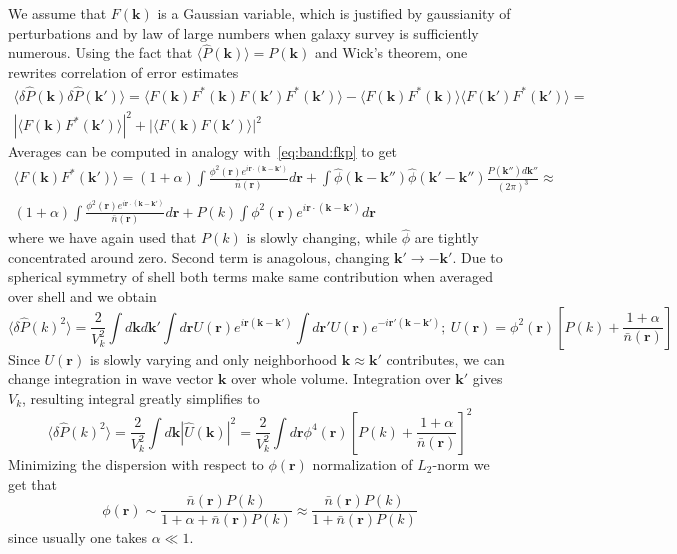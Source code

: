 \documentclass[12pt]{extarticle}
\numberwithin{problem}{section}
\numberwithin{theorem}{section}
\begin{document}
	We assume that $F(\mathbf{k})$ is a Gaussian variable, which is justified by gaussianity of perturbations and by law of large numbers when galaxy survey is sufficiently numerous. Using the fact that $\langle\hat{P}(\mathbf{k})\rangle = P(\mathbf{k})$ and Wick's theorem, one rewrites correlation of error estimates
	\begin{multline}
		\langle\delta \hat{P}(\mathbf{k})\delta \hat{P}(\mathbf{k}')\rangle = \langle F(\mathbf{k})F^*(\mathbf{k})F(\mathbf{k}')F^*(\mathbf{k}')\rangle - \langle F(\mathbf{k})F^*(\mathbf{k})\rangle\langle F(\mathbf{k}')F^*(\mathbf{k}')\rangle =\\
		|\langle F(\mathbf{k})F^*(\mathbf{k}')\rangle|^2 + |\langle F(\mathbf{k})F(\mathbf{k}')\rangle|^2
	\end{multline}
	Averages can be computed in analogy with~\ref{eq:band:fkp} to get
	\begin{multline}
		\langle F(\mathbf{k})F^*(\mathbf{k}')\rangle = (1 + \alpha)\int \frac{\phi^2(\mathbf{r})e^{i\mathbf{r}\cdot(\mathbf{k} - \mathbf{k}')}}{\bar{n}(\mathbf{r})} d\mathbf{r} + \int \hat{\phi}(\mathbf{k} - \mathbf{k}'')\hat{\phi}(\mathbf{k}' - \mathbf{k}'')\frac{P(\mathbf{k}'')d\mathbf{k}''}{(2\pi)^3}\approx\\
		(1 + \alpha)\int \frac{\phi^2(\mathbf{r})e^{i\mathbf{r}\cdot(\mathbf{k} - \mathbf{k}')}}{\bar{n}(\mathbf{r})} d\mathbf{r} + P(k)\int \phi^2(\mathbf{r})e^{i\mathbf{r}\cdot(\mathbf{k} - \mathbf{k}')} d\mathbf{r}
	\end{multline}
	where we have again used that $P(k)$ is slowly changing, while $\hat{\phi}$ are tightly concentrated around zero. Second term is anagolous, changing $\mathbf{k}'\to -\mathbf{k}'$. Due to spherical symmetry of shell both terms make same contribution when averaged over shell and we obtain
	\begin{equation}
		\langle\delta\hat{P}(k)^2\rangle = \frac{2}{V_k^2}\int d\mathbf{k}d\mathbf{k'}\int d\mathbf{r} U(\mathbf{r})e^{i\mathbf{r}(\mathbf{k} - \mathbf{k}')}\int d\mathbf{r'}U(\mathbf{r})e^{-i\mathbf{r}'(\mathbf{k} - \mathbf{k}')};\ U(\mathbf{r}) = \phi^2(\mathbf{r})\left[P(k) + \frac{1 + \alpha}{\bar{n}(\mathbf{r})}\right]
	\end{equation}
	Since $U(\mathbf{r})$ is slowly varying and only neighborhood $\mathbf{k}\approx\mathbf{k}'$ contributes, we can change integration in wave vector $\mathbf{k}$ over whole volume. Integration over $\mathbf{k}'$ gives $V_k$, resulting integral greatly simplifies to 
	\begin{equation}
		\langle\delta\hat{P}(k)^2\rangle = \frac{2}{V_k^2}\int d\mathbf{k} |\hat{U}(\mathbf{k})|^2 = \frac{2}{V_k^2}\int d\mathbf{r} \phi^4(\mathbf{r})\left[P(k) + \frac{1 + \alpha}{\bar{n}(\mathbf{r})}\right]^2
	\end{equation}
	Minimizing the dispersion with respect to $\phi(\mathbf{r})$ normalization of $L_2$-norm we get that
	\begin{equation}
		\phi(\mathbf{r})\sim\frac{\bar{n}(\mathbf{r})P(k)}{1 + \alpha + \bar{n}(\mathbf{r})P(k)}\approx \frac{\bar{n}(\mathbf{r})P(k)}{1 + \bar{n}(\mathbf{r})P(k)}
	\end{equation}
	since usually one takes $\alpha\ll 1$.
	
\end{document}
